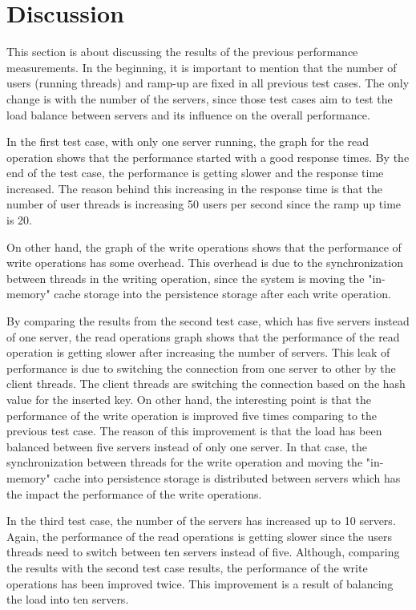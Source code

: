 \documentclass{sig-alternate}
\begin{document}
\section{Discussion}
This section is about discussing the results of the previous performance measurements. In the beginning, it is important to mention that the number of users (running threads) and ramp-up are fixed in all previous test cases. The only change is with the number of the servers, since those test cases aim to test the load balance between servers and its influence on the overall performance.

In the first test case, with only one server running, the graph for the read operation shows that the performance started with a good response times. By the end of the test case, the performance is getting slower and the response time increased. The reason behind this increasing in the response time is that the number of user threads is increasing 50 users per second since the ramp up time is 20.

On other hand, the graph of the write operations shows that the performance of write operations has some overhead. This overhead is due to the synchronization between threads in the writing operation, since the system is moving  the "in-memory" cache storage into the persistence storage after each write operation. 

By comparing the results from the second test case, which has five servers instead of one server, the read operations graph shows that the performance of the read operation is getting slower after increasing the number of servers. This leak of performance is due to switching the connection from one server to other by the client threads. The client threads are switching the connection based on the hash value for the inserted key. On other hand, the interesting point is that the performance of the write operation is improved five times comparing to the previous test case. The reason of this improvement is that the load has been balanced between five servers instead of only one server. In that case, the synchronization between threads for the write operation and moving the "in-memory" cache into persistence storage is distributed between servers which has the impact the performance of the write operations.

In the third test case, the number of the servers has increased up to 10 servers. Again, the performance of the read operations is getting slower since the users threads need to switch between ten servers instead of five. Although, comparing the results with the second test case results, the performance of the write operations has been improved twice.  This improvement  is a result of balancing the load into ten servers.
\end{document}

